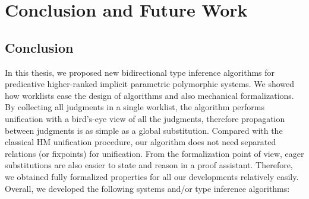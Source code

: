 \chapter{Conclusion and Future Work}
\label{chap:conclusion}


\section{Conclusion}

In this thesis, we proposed new bidirectional type inference algorithms for
predicative higher-ranked implicit parametric polymorphic systems.
We showed how worklists ease the design of algorithms
and also mechanical formalizations.
By collecting all judgments in a single worklist,
the algorithm performs unification with a bird's-eye view of all the judgments,
therefore propagation between judgments is as simple as a global substitution.
Compared with the classical HM unification procedure,
our algorithm does not need separated relations (or fixpoints) for unification.
From the formalization point of view,
eager substitutions are also easier to state and reason in a proof assistant.
Therefore, we obtained fully formalized properties for all our developments
relatively easily.
Overall, we developed the following systems and/or type inference algorithms:


